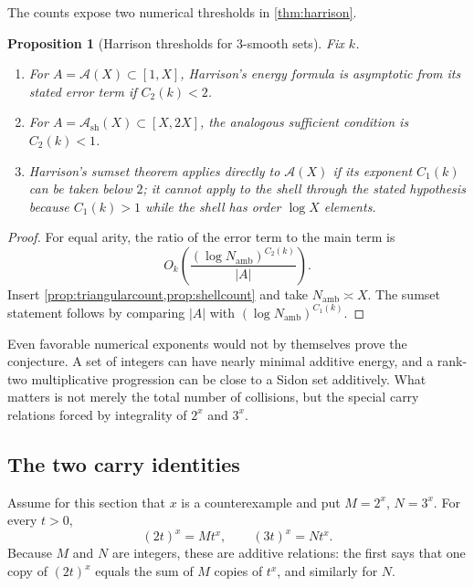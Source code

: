 \documentclass[11pt,oneside]{article}
\newtheorem{proposition}[theorem]{Proposition}
\theoremstyle{definition}
\newcommand{\cA}{\mathscr{A}}
\begin{document}
The counts expose two numerical thresholds in \cref{thm:harrison}.

\begin{proposition}[Harrison thresholds for $3$-smooth sets]\label{prop:harrisonthresholds}
Fix $k$.
\begin{enumerate}[label=\textup{(\roman*)}]
\item For $A=\cA(X)\subset[1,X]$, Harrison's energy formula is asymptotic from its stated error term if $C_2(k)<2$.
\item For $A=\cA_{\mathrm{sh}}(X)\subset[X,2X]$, the analogous sufficient condition is $C_2(k)<1$.
\item Harrison's sumset theorem applies directly to $\cA(X)$ if its exponent $C_1(k)$ can be taken below $2$; it cannot apply to the shell through the stated hypothesis because $C_1(k)>1$ while the shell has order $\log X$ elements.
\end{enumerate}
\end{proposition}

\begin{proof}
For equal arity, the ratio of the error term to the main term is
\[
      O_k\!\left(\frac{(\log N_{\mathrm{amb}})^{C_2(k)}}{|A|}\right).
\]
Insert \cref{prop:triangularcount,prop:shellcount} and take
$N_{\mathrm{amb}}\asymp X$.  The sumset statement follows by comparing
$|A|$ with $(\log N_{\mathrm{amb}})^{C_1(k)}$.
\end{proof}

Even favorable numerical exponents would not by themselves prove the conjecture.  A set of integers can have nearly minimal additive energy, and a rank-two multiplicative progression can be close to a Sidon set additively.  What matters is not merely the total number of collisions, but the special carry relations forced by integrality of $2^x$ and $3^x$.

\subsection{The two carry identities}

Assume for this section that $x$ is a counterexample and put $M=2^x$, $N=3^x$.  For every $t>0$,
\begin{equation}\label{eq:two-carries}
       (2t)^x=M t^x,
       \qquad
       (3t)^x=N t^x.
\end{equation}
Because $M$ and $N$ are integers, these are additive relations: the first says that one copy of $(2t)^x$ equals the sum of $M$ copies of $t^x$, and similarly for $N$.
\end{document}
